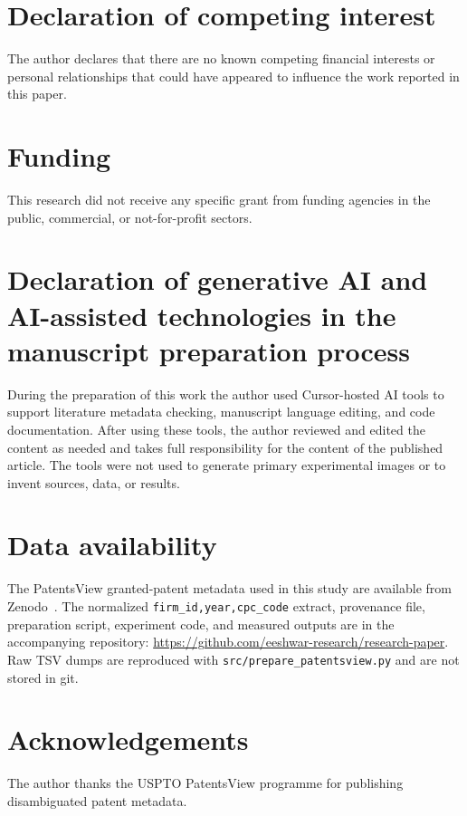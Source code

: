 \documentclass[preprint,12pt,3p]{elsarticle}
\begin{document}
\section*{Declaration of competing interest}
The author declares that there are no known competing financial interests or personal relationships that could have appeared to influence the work reported in this paper.

\section*{Funding}
This research did not receive any specific grant from funding agencies in the public, commercial, or not-for-profit sectors.

\section*{Declaration of generative AI and AI-assisted technologies in the manuscript preparation process}
During the preparation of this work the author used Cursor-hosted AI tools to support literature metadata checking, manuscript language editing, and code documentation. After using these tools, the author reviewed and edited the content as needed and takes full responsibility for the content of the published article. The tools were not used to generate primary experimental images or to invent sources, data, or results.

\section*{Data availability}
The PatentsView granted-patent metadata used in this study are available from Zenodo~\cite{uspto2025}. The normalized \texttt{firm\_id,year,cpc\_code} extract, provenance file, preparation script, experiment code, and measured outputs are in the accompanying repository: \url{https://github.com/eeshwar-research/research-paper}. Raw TSV dumps are reproduced with \texttt{src/prepare\_patentsview.py} and are not stored in git.

\section*{Acknowledgements}
The author thanks the USPTO PatentsView programme for publishing disambiguated patent metadata.
\end{document}
